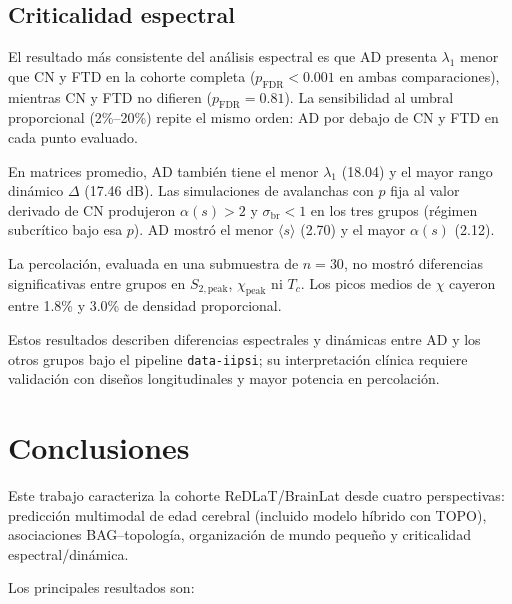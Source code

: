 \documentclass[12pt,a4paper]{article}
\begin{document}
\subsection{Criticalidad espectral}

El resultado más consistente del análisis espectral es que AD presenta $\lambda_1$ menor que
CN y FTD en la cohorte completa ($p_{\text{FDR}} < 0.001$ en ambas comparaciones), mientras
CN y FTD no difieren ($p_{\text{FDR}} = 0.81$). La sensibilidad al umbral proporcional (2\%--20\%)
repite el mismo orden: AD por debajo de CN y FTD en cada punto evaluado.

En matrices promedio, AD también tiene el menor $\lambda_1$ (18.04) y el mayor rango dinámico
$\Delta$ (17.46 dB). Las simulaciones de avalanchas con $p$ fija al valor derivado de CN
produjeron $\alpha(s) > 2$ y $\sigma_{\text{br}} < 1$ en los tres grupos (régimen subcrítico
bajo esa $p$). AD mostró el menor $\langle s \rangle$ (2.70) y el mayor $\alpha(s)$ (2.12).

La percolación, evaluada en una submuestra de $n = 30$, no mostró diferencias significativas
entre grupos en $S_{2,\text{peak}}$, $\chi_{\text{peak}}$ ni $T_c$. Los picos medios de $\chi$
cayeron entre 1.8\% y 3.0\% de densidad proporcional.

Estos resultados describen diferencias espectrales y dinámicas entre AD y los otros grupos bajo
el pipeline \texttt{data-iipsi}; su interpretación clínica requiere validación con diseños
longitudinales y mayor potencia en percolación.

\section{Conclusiones}

Este trabajo caracteriza la cohorte ReDLaT/BrainLat desde cuatro perspectivas: predicción
multimodal de edad cerebral (incluido modelo híbrido con TOPO), asociaciones BAG--topología,
organización de mundo pequeño y criticalidad espectral/dinámica.

Los principales resultados son:
\end{document}
